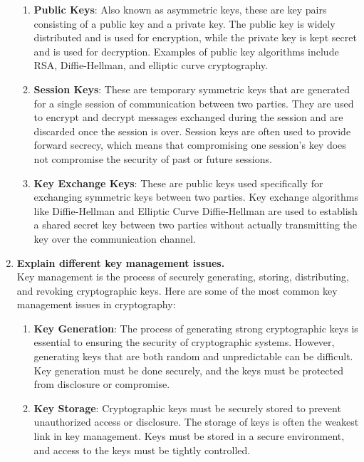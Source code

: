 \documentclass[openany]{book}
\begin{document}
\begin{enumerate}
\begin{enumerate}
              \item \textbf{Public Keys}: Also known as asymmetric keys, these are key pairs consisting of a public key and a private key. The public key is widely distributed and is used for encryption, while the private key is kept secret and is used for decryption. Examples of public key algorithms include RSA, Diffie-Hellman, and elliptic curve cryptography.

              \item \textbf{Session Keys}: These are temporary symmetric keys that are generated for a single session of communication between two parties. They are used to encrypt and decrypt messages exchanged during the session and are discarded once the session is over. Session keys are often used to provide forward secrecy, which means that compromising one session's key does not compromise the security of past or future sessions.

              \item \textbf{Key Exchange Keys}: These are public keys used specifically for exchanging symmetric keys between two parties. Key exchange algorithms like Diffie-Hellman and Elliptic Curve Diffie-Hellman are used to establish a shared secret key between two parties without actually transmitting the key over the communication channel.

          \end{enumerate}

    \item \textbf{Explain different key management issues.}\\

          Key management is the process of securely generating, storing, distributing, and revoking cryptographic keys. Here are some of the most common key management issues in cryptography:

          \begin{enumerate}
              \item \textbf{Key Generation}: The process of generating strong cryptographic keys is essential to ensuring the security of cryptographic systems. However, generating keys that are both random and unpredictable can be difficult. Key generation must be done securely, and the keys must be protected from disclosure or compromise.

              \item \textbf{Key Storage}: Cryptographic keys must be securely stored to prevent unauthorized access or disclosure. The storage of keys is often the weakest link in key management. Keys must be stored in a secure environment, and access to the keys must be tightly controlled.


\end{enumerate}
\end{enumerate}
\end{document}
